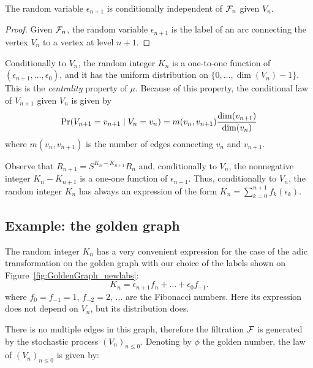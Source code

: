 \documentclass[12pt,a4paper]{article}
\begin{document}
\begin{lemma}
The random variable $\epsilon_{n+1}$ is conditionally independent of $\mathcal{F}_n$ 
given $V_n$. 
\end{lemma} 

\begin{proof}
Given $\mathcal{F}_n$, the random variable $\epsilon_{n+1}$ is the label of an 
arc connecting the vertex $V_n$ to a vertex at level $n+1$. 
\end{proof}

 Conditionally to $V_n$, the random integer $K_n$ is a one-to-one function of 
$(\epsilon_{n+1}, \ldots, \epsilon_0)$, and it has the 
uniform distribution on $\{0, \ldots, \dim(V_n)-1\}$. 
This is the \emph{centrality} property of $\mu$. 
Because of this property, the conditional law of $V_{n+1}$ given $V_n$ 
is given by 
$$
\Pr(V_{n+1}=v_{n+1} \mid V_n=v_n) = 
m(v_n, v_{n+1})\frac{\dim(v_{n+1})}{\dim(v_n)}
$$
where $m(v_n, v_{n+1})$ is the number of edges connecting $v_n$ and $v_{n+1}$. 


Observe that $R_{n+1} = S^{K_n - K_{n+1}}R_n$ and, 
conditionally to $V_n$, the nonnegative integer $K_n - K_{n+1}$ 
is a one-one function of $\epsilon_{n+1}$. 
Thus, conditionally to $V_n$, the random integer $K_n$ has always 
an expression of the form $K_n = \sum_{k=0}^{n+1}f_k(\epsilon_k)$. 


\subsection{Example: the golden graph}

The random integer $K_n$ has a very convenient expression for the case of the adic 
transformation on the golden graph with our choice of the labels shown on 
Figure~\ref{fig:GoldenGraph_newlabs}:
$$
K_n = \epsilon_{n+1}f_{n} + \ldots + \epsilon_0f_{-1}.   
$$
where $f_0=f_{-1}=1$, $f_{-2}=2$,  $\ldots$ are the Fibonacci numbers.  
Here its expression does not depend on $V_n$, but its distribution does. 

There is no multiple edges in this graph, therefore the filtration $\mathcal{F}$ 
is generated by the stochastic process ${(V_n)}_{n \leq 0}$. 
Denoting by $\phi$ the golden number, the law of 
${(V_n)}_{n \leq 0}$ is given by:
\end{document}
